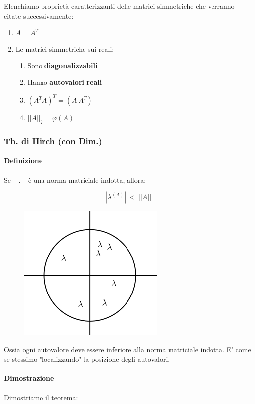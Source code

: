 \documentclass{article}
\begin{document}
Elenchiamo proprietà caratterizzanti delle matrici simmetriche che verranno citate successivamente:

\begin{enumerate}
    \item $A = A^T$
    \item Le matrici simmetriche sui reali:
    \begin{enumerate}
        \item Sono \textbf{diagonalizzabili}
        \item Hanno \textbf{autovalori reali}
    \item $(A^TA)^T = (A\:A^T)$
    \item $||A||_2 = \varphi(A)$
    \end{enumerate}
\end{enumerate}

\subsubsection{Th. di Hirch (con Dim.)}

\paragraph{Definizione} Se $||\: .\:||$ è una norma matriciale indotta, allora:

\[ | \lambda^{(A)} | \: < \:||A|| \]


\begin{figure}[htbp]
    \center
    \includegraphics[scale=0.55]{img/th_hirch.png}
\end{figure}

Ossia ogni autovalore deve essere inferiore alla norma matriciale indotta.
E' come se stessimo "localizzando" la posizione degli autovalori.

\paragraph{Dimostrazione} Dimostriamo il teorema:
\end{document}
